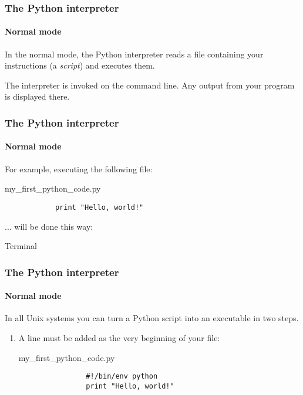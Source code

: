 \documentclass[handout]{beamer}
\begin{document}
\begin{frame}
	\frametitle{The Python interpreter}
	\framesubtitle{Normal mode}
	In the normal mode, the Python interpreter reads a file containing your instructions (a \textit{script}) and executes them.

	\bigskip
	The interpreter is invoked on the command line. Any output from your program is displayed there.
\end{frame}

\begin{frame}[fragile]
	\frametitle{The Python interpreter}
	\framesubtitle{Normal mode}

	For example, executing the following file:
	\begin{block}{my\_first\_python\_code.py}
		\begin{verbatim}
			print "Hello, world!"
		\end{verbatim}
	\end{block}

	... will be done this way:
	\begin{block}{Terminal}
	\end{block}
\end{frame}

\begin{frame}[fragile]
	\frametitle{The Python interpreter}
	\framesubtitle{Normal mode}

	In all Unix systems you can turn a Python script into an executable in two steps.

	\bigskip
	\begin{enumerate}
		\pause
		\item A line must be added as the very beginning of your file:
		\begin{block}{my\_first\_python\_code.py}
			\begin{verbatim}
				#!/bin/env python
				print "Hello, world!"
			\end{verbatim}
		\end{block}
	\end{enumerate}
\end{frame}
\end{document}
